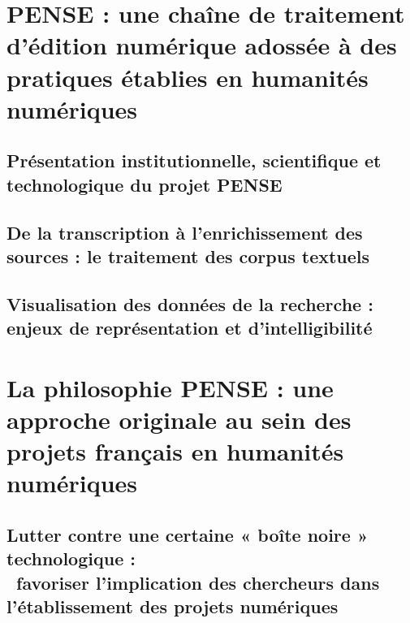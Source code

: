 \documentclass[a4paper,12pt,twoside]{book}
\newcommand{\sautdepage}{\newpage{\pagestyle{empty}\cleardoublepage}}
\begin{document}
    \part{PENSE : une chaîne de traitement d’édition numérique adossée à des pratiques établies en humanités numériques}

        \hypertarget{chap1}{%
        \chapter{Présentation institutionnelle, scientifique et technologique du projet PENSE}\label{chap1-presentation-pense}}

            
            
        \sautdepage

        \hypertarget{chap2}{%
        \chapter{De la transcription à l’enrichissement des sources : le traitement des corpus textuels}\label{chap2-traitement-textuel}}

            
            
        \sautdepage

        \hypertarget{chap3}{%
        \chapter{Visualisation des données de la recherche : enjeux de représentation et d’intelligibilité}\label{chap3-dataviz}}

            
            
        \sautdepage

    \part{La philosophie PENSE : une approche originale au sein des projets français en humanités numériques}

        \hypertarget{chap4}{%
        \chapter[Lutter contre un certaine « boîte noire » technologique]{Lutter contre une certaine « boîte noire » technologique : \\ \ favoriser l’implication des chercheurs dans l’établissement des projets numériques}\label{chap4-boite-noire}}
\end{document}
